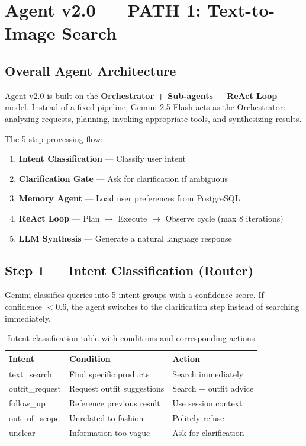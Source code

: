 \documentclass[12pt, twoside]{report}
\begin{document}
\chapter{Agent v2.0 --- PATH 1: Text-to-Image Search}

\section{Overall Agent Architecture}
Agent v2.0 is built on the \textbf{Orchestrator + Sub-agents + ReAct Loop} model. Instead of a fixed pipeline, Gemini 2.5 Flash acts as the Orchestrator: analyzing requests, planning, invoking appropriate tools, and synthesizing results.

The 5-step processing flow:
\begin{enumerate}
    \item \textbf{Intent Classification} --- Classify user intent
    \item \textbf{Clarification Gate} --- Ask for clarification if ambiguous
    \item \textbf{Memory Agent} --- Load user preferences from PostgreSQL
    \item \textbf{ReAct Loop} --- Plan $\rightarrow$ Execute $\rightarrow$ Observe cycle (max 8 iterations)
    \item \textbf{LLM Synthesis} --- Generate a natural language response
\end{enumerate}

\section{Step 1 --- Intent Classification (Router)}

\begin{tcolorbox}[title=Method: LLM Few-shot Intent Classification]
Gemini classifies queries into 5 intent groups with a confidence score. If confidence $< 0.6$, the agent switches to the clarification step instead of searching immediately.
\end{tcolorbox}

\begin{table}[H]
\centering
\begin{tabular}{lll}
\toprule
\textbf{Intent} & \textbf{Condition} & \textbf{Action}\\
\midrule
text\_search    & Find specific products         & Search immediately\\
outfit\_request & Request outfit suggestions     & Search + outfit advice\\
follow\_up      & Reference previous result      & Use session context\\
out\_of\_scope  & Unrelated to fashion           & Politely refuse\\
unclear         & Information too vague          & Ask for clarification\\
\bottomrule
\end{tabular}
\caption{Intent classification table with conditions and corresponding actions}
\end{table}
\end{document}

